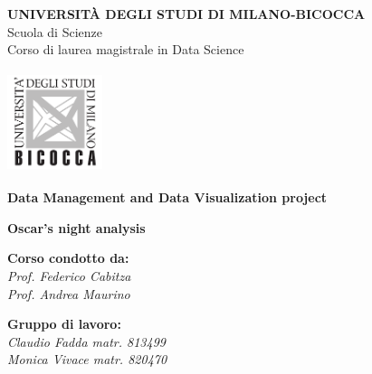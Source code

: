 \documentclass[11pt,a4paper]{report}
\begin{document}
	\begin{center}
		\begin{onehalfspace}
			\par
			\textbf{UNIVERSITÀ DEGLI STUDI DI MILANO-BICOCCA} \\
			Scuola di Scienze \\
			Corso di laurea magistrale in Data Science
		\end{onehalfspace}
	\end{center}
	\smallskip
	\begin{center}
	\includegraphics[width=2.78cm, height=2.96cm]{imgs/download.png}
\end{center}
	\begin{doublespace}
	\begin{center}
		{{{\LARGE \textbf{Data Management and Data Visualization project}}}}
	\end{center}
\end{doublespace}

	\smallskip
	
	\begin{doublespace}
		\begin{center}
			{{{\LARGE \textbf{Oscar's night analysis}}}}
		\end{center}
	\end{doublespace}




	\par
	\bigskip
	\bigskip
	\bigskip
	\bigskip
	\bigskip
	\bigskip
	\bigskip
	
	\bigskip
	\bigskip
	\bigskip
	\bigskip
	\bigskip
	\bigskip
	\vspace{8mm}
	\par
	
	\begin{flushleft}
		{\large \textbf{Corso condotto da:}  \\
			\textit{Prof. Federico Cabitza}\\
			\textit{Prof. Andrea Maurino}
		}
	\end{flushleft}
	
	\begin{onehalfspace}
		\begin{flushright}
			{\small \textbf{Gruppo di lavoro:} \\
				\textit{Claudio Fadda matr. 813499} \\
				\textit{Monica Vivace matr. 820470}}
		\end{flushright}
	\end{onehalfspace}
	
\end{document}
